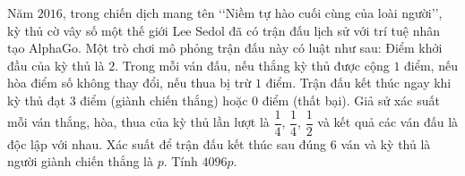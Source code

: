 \begin{ex} %
	Năm $2016$, trong chiến dịch mang tên \lq\lq Niềm tự hào cuối cùng của loài người\rq\rq, kỳ thủ cờ vây số một thế giới Lee Sedol đã có trận đấu lịch sử với trí tuệ nhân tạo AlphaGo. Một trò chơi mô phỏng trận đấu này có luật như sau: Điểm khởi đầu của kỳ thủ là $2$. Trong mỗi ván đấu, nếu thắng kỳ thủ được cộng $1$ điểm, nếu hòa điểm số không thay đổi, nếu thua bị trừ $1$ điểm. Trận đấu kết thúc ngay khi kỳ thủ đạt $3$ điểm (giành chiến thắng) hoặc $0$ điểm (thất bại). Giả sử xác suất mỗi ván thắng, hòa, thua của kỳ thủ lần lượt là $\dfrac{1}{4}$, $\dfrac{1}{4}$, $\dfrac{1}{2}$ và kết quả các ván đấu là độc lập với nhau. Xác suất để trận đấu kết thúc sau đúng $6$ ván và kỳ thủ là người giành chiến thắng là $p$. Tính $4096p$.
	\par
	\loigiai{
	}
\end{ex}